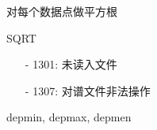 \label{cmd:sqrt}

对每个数据点做平方根

\begin{SACSTX}
SQRT
\end{SACSTX}

\begin{itemize}
\item[-]1301: 未读入文件
\item[-]1307: 对谱文件非法操作
\end{itemize}

depmin, depmax, depmen
